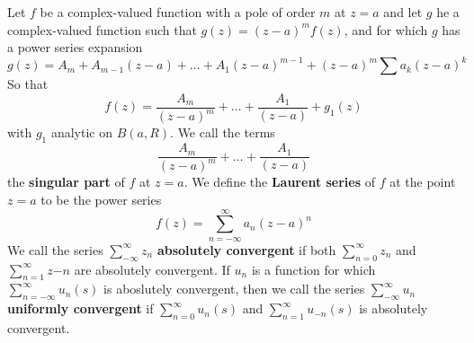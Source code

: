 \begin{definition}
    Let $f$ be a complex-valued function with a pole of order  $m$ at  $z=a$ and
    let  $g$ he a complex-valued function such that  $g(z)=(z-a)^mf(z)$, and for
    which $g$ has a power series expansion
    \begin{equation*}
        g(z)=A_m+A_{m-1}(z-a)+\dots+A_1(z-a)^{m-1}+(z-a)^m\sum{a_k(z-a)^k}
    \end{equation*}
    So that
    \begin{equation*}
        f(z)=\frac{A_m}{(z-a)^m}+\dots+\frac{A_1}{(z-a)}+g_1(z)
    \end{equation*}
    with $g_1$ analytic on $B(a,R)$. We call the terms
    \begin{equation*}
        \frac{A_m}{(z-a)^m}+\dots+\frac{A_1}{(z-a)}
    \end{equation*}
    the \textbf{singular part} of $f$ at  $z=a$. We define the  \textbf{Laurent
    series} of $f$ at the point  $z=a$ to be the power series
    \begin{equation*}
        f(z)=\sum_{n=-\infty}^\infty{a_n(z-a)^n}
    \end{equation*}
    We call the series $\sum_{-\infty}^\infty{z_n}$ \textbf{absolutely
    convergent} if both  $\sum_{n=0}^\infty{z_n}$ and
    $\sum_{n=1}^\infty{z {-n}}$ are absolutely convergent. If $u_n$ is a
    function for which $\sum_{n=-\infty}^\infty{u_n(s)}$ is aboslutely
    convergent, then we call the series $\sum_{-\infty}^\infty{u_n}$
    \textbf{uniformly convergent} if $\sum_{n=0}^\infty{u_n(s)}$ and
    $\sum_{n=1}^\infty{u_{-n}(s)}$ is absolutely convergent.
\end{definition}

